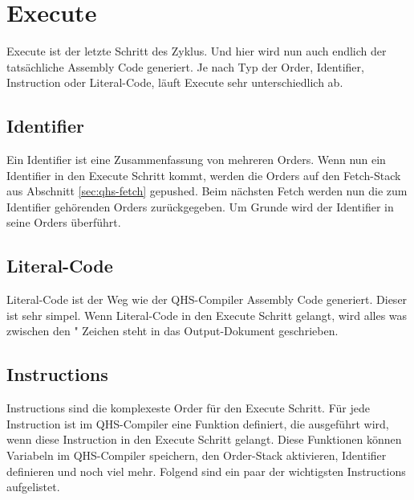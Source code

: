 \section{Execute} \label{sec:qhs-execute}
Execute ist der letzte Schritt des Zyklus. Und hier wird nun auch endlich der tatsächliche Assembly Code generiert. Je nach Typ der Order, Identifier, Instruction oder Literal-Code, läuft Execute sehr unterschiedlich ab.

\subsection{Identifier}
Ein Identifier ist eine Zusammenfassung von mehreren Orders. Wenn nun ein Identifier in den Execute Schritt kommt, werden die Orders auf den Fetch-Stack aus Abschnitt \ref{sec:qhs-fetch} gepushed.
Beim nächsten Fetch werden nun die zum Identifier gehörenden Orders zurückgegeben. Um Grunde wird der Identifier in seine Orders überführt.

\subsection{Literal-Code}
Literal-Code ist der Weg wie der QHS-Compiler Assembly Code generiert. Dieser ist sehr simpel. Wenn Literal-Code in den Execute Schritt gelangt, wird alles was zwischen den " Zeichen steht in das Output-Dokument geschrieben.

\subsection{Instructions}
Instructions sind die komplexeste Order für den Execute Schritt. Für jede Instruction ist im QHS-Compiler eine Funktion definiert, die ausgeführt wird, wenn diese Instruction in den Execute Schritt gelangt.
Diese Funktionen können Variabeln im QHS-Compiler speichern, den Order-Stack aktivieren, Identifier definieren und noch viel mehr. Folgend sind ein paar der wichtigsten Instructions aufgelistet.

